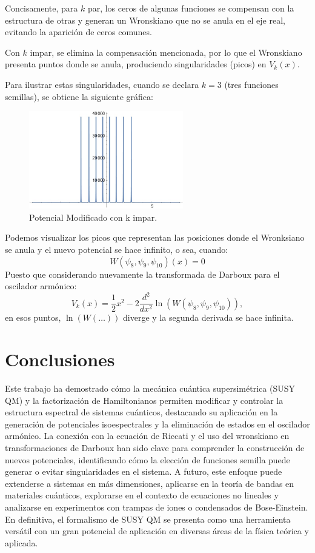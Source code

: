 \documentclass[%
 aip,
 jmp,%
 amsmath,amssymb,
 reprint,
]{revtex4-2}
\begin{document}
Concisamente, para \( k \) par, los ceros de algunas funciones se compensan con la estructura de otras y generan un Wronskiano que no se anula en el eje real, evitando la aparición de ceros comunes. 

Con \( k \) impar, se elimina la compensación mencionada, por lo que el Wronskiano presenta puntos donde se anula, produciendo singularidades (picos) en \( V_k(x) \). 

Para ilustrar estas singularidades, cuando se declara \( k = 3 \) (tres funciones semillas), se obtiene la siguiente gráfica:

\begin{figure}[H]
    \centering
    \includegraphics[width=0.6\textwidth]{QHO_Odd.jpeg}
    \caption{Potencial Modificado con k impar.}
    \label{fig:modified_oscillator}
\end{figure}
Podemos visualizar los picos que representan las posiciones donde el Wronksiano se anula y el nuevo potencial se hace infinito, o sea, cuando:
\begin{equation}
W(\psi_8, \psi_9, \psi_{10})(x)=0
\end{equation}
Puesto que considerando nuevamente la transformada de Darboux para el oscilador armónico:
\begin{equation}
V_k(x) = \frac{1}{2} x^2 - 2 \frac{d^2}{dx^2} \ln \left( W(\psi_8, \psi_9, \psi_{10}) \right),
\end{equation}
en esos puntos, \( \ln(W(\dots)) \) diverge y la segunda derivada se hace infinita.

\section{Conclusiones}
Este trabajo ha demostrado cómo la mecánica cuántica supersimétrica (SUSY QM) y la factorización de Hamiltonianos permiten modificar y controlar la estructura espectral de sistemas cuánticos, destacando su aplicación en la generación de potenciales isoespectrales y la eliminación de estados en el oscilador armónico. La conexión con la ecuación de Riccati y el uso del wronskiano en transformaciones de Darboux han sido clave para comprender la construcción de nuevos potenciales, identificando cómo la elección de funciones semilla puede generar o evitar singularidades en el sistema. A futuro, este enfoque puede extenderse a sistemas en más dimensiones, aplicarse en la teoría de bandas en materiales cuánticos, explorarse en el contexto de ecuaciones no lineales y analizarse en experimentos con trampas de iones o condensados de Bose-Einstein. En definitiva, el formalismo de SUSY QM se presenta como una herramienta versátil con un gran potencial de aplicación en diversas áreas de la física teórica y aplicada.
\end{document}
